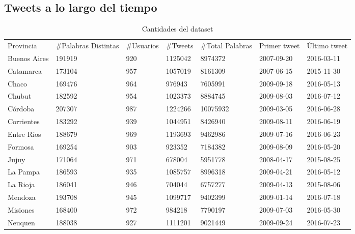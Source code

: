 \subsection{Tweets a lo largo del tiempo}

\begin{table}[]
\centering
\caption{Cantidades del dataset}
\label{my-label}
\begin{tabular}{lllllll}
Provincia      & \#Palabras Distintas & \#Usuarios & \#Tweets & \#Total Palabras & Primer tweet & Último tweet \\
Buenos Aires    & 191919       & 920          & 1125042    & 8974372   & 2007-09-20   & 2016-03-11   \\
Catamarca      & 173104       & 957          & 1057019    & 8161309   & 2007-06-15   & 2015-11-30   \\
Chaco          & 169476       & 964          & 976943     & 7605991   & 2009-09-18   & 2016-05-13   \\
Chubut         & 182592       & 954          & 1023373    & 8884745   & 2009-08-03   & 2016-07-12   \\
Córdoba        & 207307       & 987          & 1224266    & 10075932  & 2009-03-05   & 2016-06-28   \\
Corrientes     & 183292       & 939          & 1044951    & 8426940   & 2009-08-11   & 2016-06-19   \\
Entre Ríos      & 188679       & 969          & 1193693    & 9462986   & 2009-07-16   & 2016-06-23   \\
Formosa        & 169254       & 903          & 923352     & 7184382   & 2009-08-09   & 2016-05-20   \\
Jujuy          & 171064       & 971          & 678004     & 5951778   & 2008-04-17   & 2015-08-25   \\
La Pampa        & 186593       & 935          & 1085757    & 8996318   & 2009-04-21   & 2016-05-12   \\
La Rioja        & 186041       & 946          & 704044     & 6757277   & 2009-04-13   & 2015-08-06   \\
Mendoza        & 193708       & 945          & 1099717    & 9402399   & 2009-01-14   & 2016-07-18   \\
Misiones       & 168400       & 972          & 984218     & 7790197   & 2009-07-03   & 2016-05-30   \\
Neuquen        & 188038       & 927          & 1111201    & 9021449   & 2009-09-24   & 2016-07-23   \\

\end{tabular}
\end{table}
